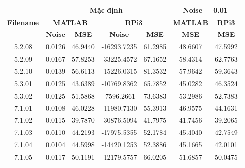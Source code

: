 \begin{table}[H]
\centering
\begin{tabular}{|c|cccc|cc|}
\hline
\multirow{3}{*}{\textbf{Filename}} & \multicolumn{4}{c|}{\textbf{Mặc định}} & \multicolumn{2}{c|}{\textbf{Noise = 0.01}} \\ \cline{2-7} 
 & \multicolumn{2}{c|}{\textbf{MATLAB}} & \multicolumn{2}{c|}{\textbf{RPi3}} & \multicolumn{1}{c|}{\textbf{MATLAB}} & \textbf{RPi3} \\ \cline{2-7} 
 & \multicolumn{1}{c|}{\textbf{Noise}} & \multicolumn{1}{c|}{\textbf{MSE}} & \multicolumn{1}{c|}{\textbf{Noise}} & \textbf{MSE} & \multicolumn{1}{c|}{\textbf{MSE}} & \textbf{MSE} \\ \hline
5.2.08 & \multicolumn{1}{c|}{0.0126} & \multicolumn{1}{c|}{46.9440} & \multicolumn{1}{c|}{-16293.7235} & 61.2985 & \multicolumn{1}{c|}{48.6607} & 47.5992 \\ \hline
5.2.09 & \multicolumn{1}{c|}{0.0167} & \multicolumn{1}{c|}{57.8253} & \multicolumn{1}{c|}{-33225.4572} & 67.1652 & \multicolumn{1}{c|}{58.4314} & 62.7763 \\ \hline
5.2.10 & \multicolumn{1}{c|}{0.0139} & \multicolumn{1}{c|}{56.6113} & \multicolumn{1}{c|}{-15226.0315} & 81.3532 & \multicolumn{1}{c|}{57.9642} & 59.3643 \\ \hline
5.3.01 & \multicolumn{1}{c|}{0.0125} & \multicolumn{1}{c|}{43.6389} & \multicolumn{1}{c|}{-10769.8362} & 65.7852 & \multicolumn{1}{c|}{45.0282} & 46.3524 \\ \hline
5.3.02 & \multicolumn{1}{c|}{0.0125} & \multicolumn{1}{c|}{51.5868} & \multicolumn{1}{c|}{-7596.2661} & 73.6383 & \multicolumn{1}{c|}{53.2986} & 52.7383 \\ \hline
7.1.01 & \multicolumn{1}{c|}{0.0108} & \multicolumn{1}{c|}{46.0228} & \multicolumn{1}{c|}{-11980.7130} & 55.3913 & \multicolumn{1}{c|}{46.9575} & 44.1631 \\ \hline
7.1.02 & \multicolumn{1}{c|}{0.0115} & \multicolumn{1}{c|}{39.7870} & \multicolumn{1}{c|}{-30876.5094} & 41.7975 & \multicolumn{1}{c|}{41.7456} & 39.2065 \\ \hline
7.1.03 & \multicolumn{1}{c|}{0.0110} & \multicolumn{1}{c|}{44.2193} & \multicolumn{1}{c|}{-17975.5355} & 52.1784 & \multicolumn{1}{c|}{45.4040} & 42.7549 \\ \hline
7.1.04 & \multicolumn{1}{c|}{0.0104} & \multicolumn{1}{c|}{44.5998} & \multicolumn{1}{c|}{-14420.1253} & 52.3886 & \multicolumn{1}{c|}{45.1665} & 42.0101 \\ \hline
7.1.05 & \multicolumn{1}{c|}{0.0117} & \multicolumn{1}{c|}{50.1191} & \multicolumn{1}{c|}{-12179.5757} & 66.0205 & \multicolumn{1}{c|}{51.6857} & 50.0475 \\ \hline

\end{tabular}
\end{table}
